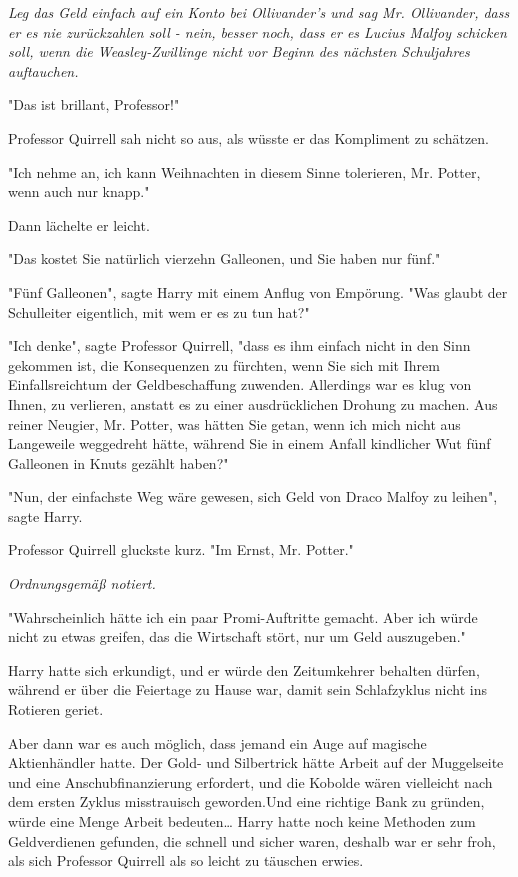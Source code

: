{\emph{Leg das Geld einfach auf ein Konto bei Ollivander's und sag Mr. Ollivander, dass er es nie zurückzahlen soll - nein, besser noch, dass er es Lucius Malfoy schicken soll, wenn die Weasley-Zwillinge nicht vor Beginn des nächsten Schuljahres auftauchen.}

"Das ist brillant, Professor!"

Professor Quirrell sah nicht so aus, als wüsste er das Kompliment zu schätzen.

"Ich nehme an, ich kann Weihnachten in diesem Sinne tolerieren, Mr. Potter, wenn auch nur knapp."

Dann lächelte er leicht.

"Das kostet Sie natürlich vierzehn Galleonen, und Sie haben nur fünf."

"Fünf Galleonen", sagte Harry mit einem Anflug von Empörung. "Was glaubt der Schulleiter eigentlich, mit wem er es zu tun hat?"

"Ich denke", sagte Professor Quirrell, "dass es ihm einfach nicht in den Sinn gekommen ist, die Konsequenzen zu fürchten, wenn Sie sich mit Ihrem Einfallsreichtum der Geldbeschaffung zuwenden. Allerdings war es klug von Ihnen, zu verlieren, anstatt es zu einer ausdrücklichen Drohung zu machen. Aus reiner Neugier, Mr. Potter, was hätten Sie getan, wenn ich mich nicht aus Langeweile weggedreht hätte, während Sie in einem Anfall kindlicher Wut fünf Galleonen in Knuts gezählt haben?"

"Nun, der einfachste Weg wäre gewesen, sich Geld von Draco Malfoy zu leihen", sagte Harry.

Professor Quirrell gluckste kurz. "Im Ernst, Mr. Potter."

\emph{Ordnungsgemäß notiert.}

"Wahrscheinlich hätte ich ein paar Promi-Auftritte gemacht. Aber ich würde nicht zu etwas greifen, das die Wirtschaft stört, nur um Geld auszugeben."

Harry hatte sich erkundigt, und er würde den Zeitumkehrer behalten dürfen, während er über die Feiertage zu Hause war, damit sein Schlafzyklus nicht ins Rotieren geriet.

Aber dann war es auch möglich, dass jemand ein Auge auf magische Aktienhändler hatte. Der Gold- und Silbertrick hätte Arbeit auf der Muggelseite und eine Anschubfinanzierung erfordert, und die Kobolde wären vielleicht nach dem ersten Zyklus misstrauisch geworden.Und eine richtige Bank zu gründen, würde eine Menge Arbeit bedeuten… Harry hatte noch keine Methoden zum Geldverdienen gefunden, die schnell und sicher waren, deshalb war er sehr froh, als sich Professor Quirrell als so leicht zu täuschen erwies.

}
